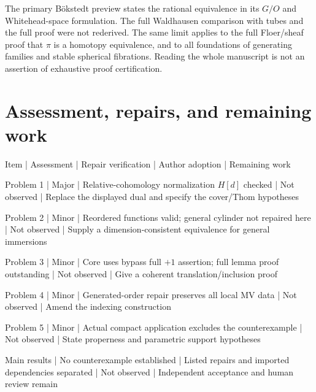 \documentclass[10pt]{article}
\begin{document}
The primary Bökstedt preview states the rational equivalence in its \(G/O\) and Whitehead-space formulation. The full Waldhausen comparison with tubes and the full proof were not rederived. The same limit applies to the full Floer/sheaf proof that \(\pi\) is a homotopy equivalence, and to all foundations of generating families and stable spherical fibrations. Reading the whole manuscript is not an assertion of exhaustive proof certification.\par
\section*{Assessment, repairs, and remaining work}
Item | Assessment | Repair verification | Author adoption | Remaining work\par
Problem 1 | Major | Relative-cohomology normalization \(H[d]\) checked | Not observed | Replace the displayed dual and specify the cover/Thom hypotheses\par
Problem 2 | Minor | Reordered functions valid; general cylinder not repaired here | Not observed | Supply a dimension-consistent equivalence for general immersions\par
Problem 3 | Minor | Core uses bypass full \(+1\) assertion; full lemma proof outstanding | Not observed | Give a coherent translation/inclusion proof\par
Problem 4 | Minor | Generated-order repair preserves all local MV data | Not observed | Amend the indexing construction\par
Problem 5 | Minor | Actual compact application excludes the counterexample | Not observed | State properness and parametric support hypotheses\par
Main results | No counterexample established | Listed repairs and imported dependencies separated | Not observed | Independent acceptance and human review remain\par
\end{document}
